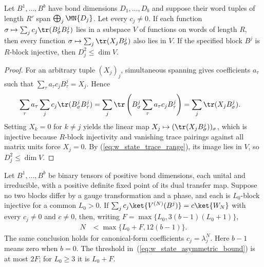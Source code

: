\begin{lemma}%
    \label{thm:w_state_one_sided_cut_rank}
    \leanok
    Let $B^1,\ldots,B^b$ have bond dimensions $D_1,\ldots,D_b$ and suppose
    their word tuples of length $R'$ span $\bigoplus_j\MN{D_j}$. Let every
    $c_j\ne0$. If each function
    $\sigma\mapsto\sum_jc_j\tr(B^j_\sigma B^j_\tau)$ lies in a subspace $V$
    of functions on words of length $R$, then every function
    $\sigma\mapsto\sum_j\tr(X_jB^j_\sigma)$ also lies in $V$.
    If the specified block $B^j$ is $R$-block injective, then $D_j^2\le\dim V$.
\end{lemma}

\begin{proof}
    \leanok
    For an arbitrary tuple $(X_j)_j$, simultaneous spanning gives coefficients
    $a_\tau$ such that $\sum_\tau a_\tau c_jB^j_\tau=X_j$. Hence
    \begin{align}
        \sum_\tau a_\tau\sum_jc_j\tr(B^j_\sigma B^j_\tau)
         & =\sum_j\tr\left(B^j_\sigma\sum_\tau a_\tau c_jB^j_\tau\right)
        =\sum_j\tr(X_jB^j_\sigma).
        \label{eq:w_state_trace_range}
    \end{align}
    Setting $X_k=0$ for $k\ne j$ yields the linear map
    $X_j\mapsto(\tr(X_jB^j_\sigma))_\sigma$, which is injective because
    $R$-block injectivity and vanishing trace pairings against all matrix
    units force $X_j=0$. By (\ref{eq:w_state_trace_range}), its image lies in
    $V$, so $D_j^2\le\dim V$.
\end{proof}

\begin{lemma}%
    \label{thm:w_state_asymmetric_bound}
    \leanok
    Let $B^1,\ldots,B^b$ be binary tensors of positive bond dimensions, each
    unital and irreducible, with a positive definite fixed point of its dual
    transfer map. Suppose no two blocks differ by a gauge transformation and
    a phase, and each is $L_0$-block injective for a common $L_0>0$.
    If $\sum_jc_j\ket{V^{(N)}(B^j)}=c\ket{W_N}$ with every $c_j\ne0$ and
    $c\ne0$, then, writing $F=\max\{L_0,3(b-1)(L_0+1)\}$,
    \begin{align}
        N & <\max\{L_0+F,12(b-1)\}.
        \label{eq:w_state_asymmetric_bound}
    \end{align}
    The same conclusion holds for canonical-form coefficients $c_j=\lambda_j^N$.
    Here $b-1$ means zero when $b=0$.
    The threshold in~(\ref{eq:w_state_asymmetric_bound}) is at most $2F$;
    for $L_0\ge3$ it is $L_0+F$.
\end{lemma}

